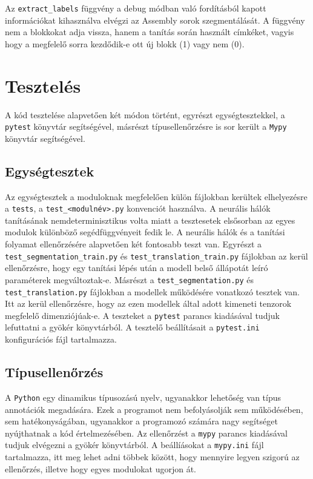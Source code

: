 Az \texttt{extract\_labels} függvény a debug módban való fordításból kapott információkat kihasználva
elvégzi az Assembly sorok szegmentálását. A függvény nem a blokkokat adja vissza, hanem a tanítás során
használt címkéket, vagyis hogy a megfelelő sorra kezdődik-e ott új blokk (1) vagy nem (0).

\section{Tesztelés}
A kód tesztelése alapvetően két módon történt, egyrészt egységtesztekkel, a
\texttt{pytest}\cite{pytest7.1} könyvtár segítségével, másrészt típusellenőrzésre is sor került
a \texttt{Mypy}\cite{mypy} könyvtár segítségével.

\subsection{Egységtesztek}
Az egységtesztek a moduloknak megfelelően külön
fájlokban kerültek elhelyezésre a \texttt{tests}, a \texttt{test\_<modulnév>.py} konvenciót használva.
A neurális hálók tanításának nemdeterminisztikus volta miatt a tesztesetek elsősorban az egyes modulok
különböző segédfüggvényeit fedik le. A neurális hálók és a tanítási folyamat ellenőrzésére alapvetően két
fontosabb teszt van. Egyrészt a \texttt{test\_segmentation\_train.py} és \texttt{test\_translation\_train.py}
fájlokban az kerül ellenőrzésre, hogy egy tanítási lépés után a modell belső állápotát leíró paraméterek
megváltoztak-e. Másrészt a \texttt{test\_segmentation.py} és \texttt{test\_translation.py} fájlokban
a modellek működésére vonatkozó tesztek van. Itt az kerül ellenőrzésre, hogy az ezen modellek által adott
kimeneti tenzorok megfelelő dimenziójúak-e. A teszteket a \texttt{pytest} parancs kiadásával tudjuk lefuttatni
a gyökér könyvtárból. A tesztelő beállításait a \texttt{pytest.ini} konfigurációs fájl tartalmazza.

\subsection{Típusellenőrzés}
A \texttt{Python} egy dinamikus típusozású nyelv, ugyanakkor lehetőség van típus annotációk megadására.
Ezek a programot nem befolyásolják sem működésében, sem hatékonyságában, ugyanakkor a programozó számára
nagy segítséget nyújthatnak a kód értelmezésében. Az ellenőrzést a \texttt{mypy} parancs kiadásával
tudjuk elvégezni a gyökér könyvtárból. A beállíásokat a \texttt{mypy.ini} fájl tartalmazza, itt meg lehet
adni többek között, hogy mennyire legyen szigorú az ellenőrzés, illetve hogy egyes modulokat ugorjon át.
